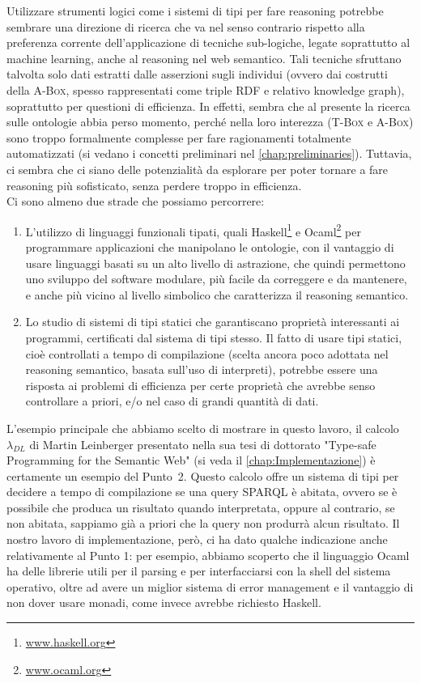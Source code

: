 Utilizzare strumenti logici come i sistemi di tipi per fare reasoning potrebbe sembrare una direzione di ricerca che va nel senso contrario 
rispetto alla preferenza corrente dell'applicazione di tecniche sub-logiche, legate soprattutto al machine learning, anche al reasoning nel web 
semantico. Tali tecniche sfruttano talvolta solo dati estratti dalle asserzioni sugli individui (ovvero dai costrutti della \textsc{A-Box}, spesso rappresentati 
come triple RDF e relativo knowledge graph), soprattutto per questioni di efficienza. In effetti, sembra che al presente  la ricerca sulle ontologie abbia 
perso momento, perché nella loro interezza (\textsc{T-Box} e \textsc{A-Box}) sono troppo formalmente complesse per fare ragionamenti totalmente automatizzati (si vedano i 
concetti preliminari nel \autoref{chap:preliminaries}). Tuttavia, ci sembra che ci siano delle potenzialità da esplorare per poter tornare a fare reasoning più 
sofisticato, senza perdere troppo in efficienza.
\\
Ci sono almeno due strade che possiamo percorrere:
\begin{enumerate}
	\item L'utilizzo di linguaggi funzionali tipati, quali Haskell\footnote{\url{www.haskell.org}} e Ocaml\footnote{\url{www.ocaml.org}} per programmare applicazioni che manipolano le ontologie, con il 
	vantaggio di usare linguaggi basati su un alto livello di astrazione, che quindi permettono uno sviluppo del software modulare, più facile da correggere e da 
	mantenere, e anche più vicino al livello simbolico che caratterizza il reasoning semantico. 
	\item Lo studio di sistemi di tipi statici che garantiscano proprietà 
	interessanti ai programmi, certificati dal sistema di tipi stesso. Il fatto di usare tipi statici, cioè controllati a tempo di compilazione (scelta ancora 
	poco adottata nel reasoning semantico, basata sull'uso di interpreti), potrebbe essere una risposta ai problemi di efficienza per certe proprietà che avrebbe 
	senso controllare a priori, e/o nel caso di grandi quantità di dati.
\end{enumerate}

L'esempio principale che abbiamo scelto di mostrare in questo lavoro, il calcolo $\lambda_{DL}$ di Martin Leinberger presentato nella sua tesi di dottorato 
"Type-safe Programming for the Semantic Web" \cite{leinbergerphdthesis} (si veda il \autoref{chap:Implementazione}) è certamente un esempio del \mbox{Punto 2}. Questo calcolo offre un sistema di tipi per decidere a tempo di compilazione se una query SPARQL è abitata, ovvero se è possibile che produca un risultato quando interpretata, oppure al 
contrario, se non abitata, sappiamo già a priori che la query non produrrà alcun risultato.  Il nostro lavoro di implementazione, però, ci ha dato qualche 
indicazione anche relativamente al Punto 1: per esempio, abbiamo scoperto che il linguaggio Ocaml ha delle librerie utili per il parsing e per interfacciarsi 
con la shell del sistema operativo, oltre ad avere un miglior sistema di error management e il vantaggio di non dover usare monadi, come invece avrebbe 
richiesto Haskell.

